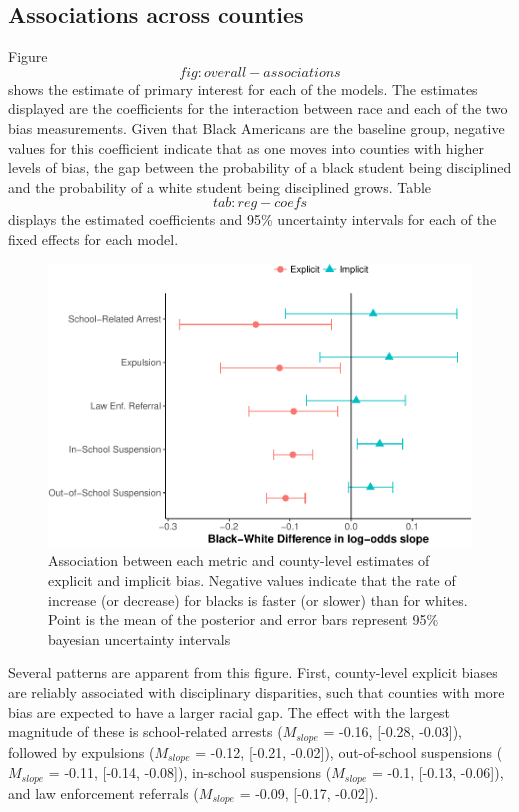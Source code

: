 \documentclass[9pt,twocolumn,twoside,lineno]{pnas-new}
\begin{document}
\subsection{Associations across
counties}\label{associations-across-counties}

Figure \[fig:overall-associations\] shows the estimate of primary
interest for each of the models. The estimates displayed are the
coefficients for the interaction between race and each of the two bias
measurements. Given that Black Americans are the baseline group,
negative values for this coefficient indicate that as one moves into
counties with higher levels of bias, the gap between the probability of
a black student being disciplined and the probability of a white student
being disciplined grows. Table \[tab:reg-coefs\] displays the estimated
coefficients and 95\% uncertainty intervals for each of the fixed
effects for each model.

\begin{figure}
\centering
\includegraphics{Riddle_Sinclair_PNAS_files/figure-latex/overall-associations-1.pdf}
\caption{Association between each metric and county-level estimates of
explicit and implicit bias. Negative values indicate that the rate of
increase (or decrease) for blacks is faster (or slower) than for whites.
Point is the mean of the posterior and error bars represent 95\%
bayesian uncertainty intervals}
\end{figure}

Several patterns are apparent from this figure. First, county-level
explicit biases are reliably associated with disciplinary disparities,
such that counties with more bias are expected to have a larger racial
gap. The effect with the largest magnitude of these is school-related
arrests (\(M_{slope}\) = -0.16, {[}-0.28, -0.03{]}), followed by
expulsions (\(M_{slope}\) = -0.12, {[}-0.21, -0.02{]}), out-of-school
suspensions (\(M_{slope}\) = -0.11, {[}-0.14, -0.08{]}), in-school
suspensions (\(M_{slope}\) = -0.1, {[}-0.13, -0.06{]}), and law
enforcement referrals (\(M_{slope}\) = -0.09, {[}-0.17, -0.02{]}).
\end{document}
